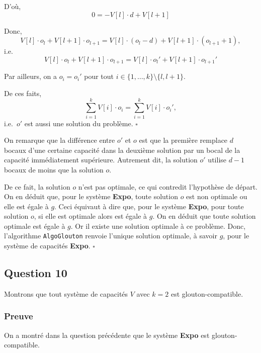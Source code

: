 \documentclass[12pt,a4paper]{article}
\begin{document}
\begin{enumerate}[a)]
 D'o\`u, 
 \begin{equation*}
    0 = -V[l]\cdot d + V[l+1]
 \end{equation*}
 
 Donc, 
 \begin{equation*}
    V[l]\cdot o_l + V[l+1]\cdot o_{l+1} = V[l]\cdot (o_l-d) + V[l+1]\cdot (o_{l+1} + 1),
 \end{equation*}
 i.e.\ 
 \begin{equation*}
    V[l]\cdot o_l + V[l+1]\cdot o_{l+1} = V[l]\cdot o_l' + V[l+1]\cdot o_{l+1}'
 \end{equation*}
  
  Par ailleurs, on a $o_i = o_i' $ pour tout $i \in \{1, \dotsc, k\}\setminus \{ l,l+1 \}$. 
  
  De ces faits, 
  \begin{equation*}
   \displaystyle\sum_{i=1}^{k} V[i]\cdot o_i = \displaystyle\sum_{i=1}^{k} V[i]\cdot o_i',
  \end{equation*}
  i.e.\ $o'$ est aussi une solution du probl\`eme. \hfill\ensuremath{\square}
  
  \medskip
  On remarque que la diff\'erence entre $o'$ et $o$ est que la premi\`ere remplace $d$ bocaux d'une certaine capacit\'e dans la deuxi\`eme solution par un bocal de la capacit\'e imm\'ediatement sup\'erieure. Autrement dit, la solution $o'$ utilise $d-1$ bocaux de moins que la solution $o$.
  
  De ce fait, la solution $o$ n'est pas optimale, ce qui contredit l'hypoth\`ese de d\'epart. On en d\'eduit que, pour le syst\`eme {\bfseries Expo}, toute solution $o$ est non optimale ou elle est \'egale \`a $g$. Ceci \'equivaut \`a dire que, pour le syst\`eme {\bfseries Expo}, pour toute solution $o$, si elle est optimale alors est \'egale \`a $g$. On en d\'eduit que toute solution optimale est \'egale \`a $g$. Or il existe une solution optimale \`a ce probl\`eme. Donc, l'algorithme \texttt{AlgoGlouton} renvoie l'unique solution optimale, \`a savoir $g$, pour le syst\`eme de capacit\'es {\bfseries Expo}. \hfill\ensuremath{\square}
\end{enumerate}

\subsection*{Question 10}
 Montrons que tout syst\`eme de capacit\'es $V$ avec $k = 2$ est glouton-compatible.

 \subsubsection*{Preuve}
 On a montr\'e dans la question pr\'ec\'edente que le syst\`eme {\bfseries Expo} est glouton-compatible.
\end{document}
